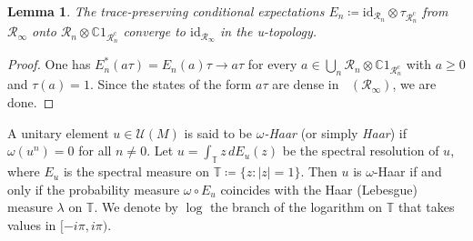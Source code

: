 \documentclass[12pt,nosumlimits,nonamelimits]{amsart}
\newtheorem{lem}[thm]{Lemma}
\theoremstyle{remark}
\newcommand{\IC}{\mathbb{C}}
\newcommand{\IT}{\mathbb{T}}
\newcommand{\cR}{\mathcal{R}}
\newcommand{\cU}{\mathcal{U}}
\newcommand{\id}{\mathrm{id}}
\newcommand{\ns}{\mathop{\mathcal{S}_{\mathrm{n}}}}
\begin{document}
\begin{lem}\label{lem:martingale}
The trace-preserving conditional expectations 
$E_n\coloneqq\id_{\cR_n}\otimes\tau_{\cR_n^{\mathrm{c}}}$ 
from $\cR_\infty$ onto $\cR_n\otimes\IC1_{\cR_n^{\mathrm{c}}}$ 
converge to $\id_{\cR_\infty}$ in the u-topo\-logy. 
\end{lem}
\begin{proof}
One has $E_n^*(a\tau)=E_n(a)\tau\to a\tau$ for every 
$a\in \bigcup_n \cR_n\otimes\IC1_{\cR_n^{\mathrm{c}}}$ 
with $a\geq0$ and $\tau(a)=1$.
Since the states of the form $a\tau$ are dense 
in $\ns(\cR_\infty)$, we are done.
\end{proof}

A unitary element $u\in\cU(M)$ is said to be 
\emph{$\omega$-Haar} (or simply \emph{Haar}) if 
$\omega(u^n)=0$ for all $n\neq0$. 
Let $u=\int_\IT z\,dE_u(z)$ be the spectral resolution of $u$, 
where  $E_u$ is the spectral measure on $\IT\coloneqq\{ z : |z|=1\}$. 
Then $u$ is $\omega$-Haar if and only if the probability measure 
$\omega\circ E_u$ coincides with the Haar (Lebesgue) measure $\lambda$ on $\IT$. 
We denote by $\log$ the branch of 
the logarithm on $\IT$ that takes values in $[-i\pi,i\pi)$. 
\end{document}
